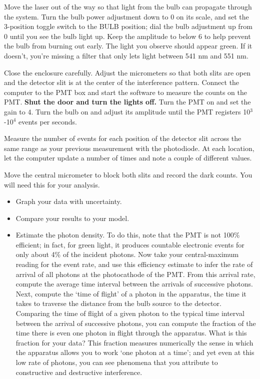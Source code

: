 \documentclass[11pt]{article}
\begin{document}
\vspace{5mm}


Move the laser out of the way so that light from the bulb can propagate through
the system. Turn the bulb power adjustment down to 0 on its scale, and set the
3-position toggle switch to the BULB position; dial the bulb adjustment up from 0 until
you see the bulb light up. Keep the amplitude to below 6 to help prevent the
bulb from burning out early. The light you observe should appear green. If it
doesn't, you're missing a filter that only lets light between 541 nm and 551 nm. 

Close the enclosure carefully. Adjust the micrometers so that both slits are
open and the detector slit is at the center of the interference pattern. Connect
the computer to the PMT box and start the software to measure the counts on the
PMT. {\bf Shut the door and turn the lights off.} Turn the PMT on and set the
gain to 4. Turn the bulb on and adjust its amplitude until the PMT registers
10$^3$-10$^4$ events per seconds.

Measure the number of events for each position of the detector slit across the
same range as your previous measurement with the photodiode. At each location,
let the computer update a number of times and note a couple of different values. 

Move the central micrometer to block both slits and record the dark counts. You
will need this for your analysis.

\vspace{5mm}


\begin{itemize}
\item Graph your data with uncertainty.
\item Compare your results to your model.
\item Estimate the photon density. To do this, note that the PMT is not 100\%
efficient; in fact, for green light, it produces countable electronic events for
only about 4\% of the incident photons. Now take your central-maximum reading
for the event rate, and use this efficiency estimate to infer the rate of
arrival of all photons at the photocathode of the PMT. From this arrival rate,
compute the average time interval between the arrivals of successive photons.
Next, compute the ‘time of flight’ of a photon in the apparatus, the time it
takes to traverse the distance from the bulb source to the detector. Comparing
the time of flight of a given photon to the typical time interval between the
arrival of successive photons, you can compute the fraction of the time there is
even one photon in flight through the apparatus. What is this fraction for your
data? This fraction measures numerically the sense in which the apparatus allows
you to work ‘one photon at a time’; and yet even at this low rate of photons,
you can see phenomena that you attribute to constructive and destructive
interference.
\end{itemize}
\vspace{5mm}
\end{document}
